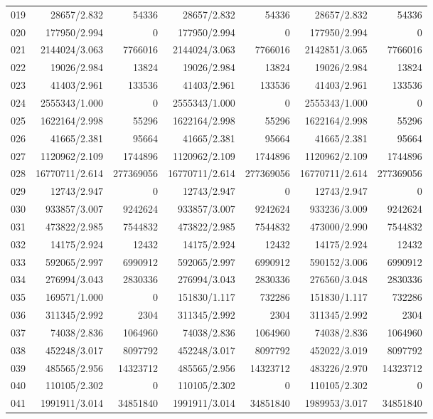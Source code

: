 \begin{longtable}{crrrrrr}
019 & 28657/2.832 & 54336 & 28657/2.832 & 54336 & 28657/2.832 & 54336 \\
020 & 177950/2.994 & 0 & 177950/2.994 & 0 & 177950/2.994 & 0 \\
021 & 2144024/3.063 & 7766016 & 2144024/3.063 & 7766016 & 2142851/3.065 & 7766016 \\
022 & 19026/2.984 & 13824 & 19026/2.984 & 13824 & 19026/2.984 & 13824 \\
023 & 41403/2.961 & 133536 & 41403/2.961 & 133536 & 41403/2.961 & 133536 \\
024 & 2555343/1.000 & 0 & 2555343/1.000 & 0 & 2555343/1.000 & 0 \\
025 & 1622164/2.998 & 55296 & 1622164/2.998 & 55296 & 1622164/2.998 & 55296 \\
026 & 41665/2.381 & 95664 & 41665/2.381 & 95664 & 41665/2.381 & 95664 \\
027 & 1120962/2.109 & 1744896 & 1120962/2.109 & 1744896 & 1120962/2.109 & 1744896 \\
028 & 16770711/2.614 & 277369056 & 16770711/2.614 & 277369056 & 16770711/2.614 & 277369056 \\
029 & 12743/2.947 & 0 & 12743/2.947 & 0 & 12743/2.947 & 0 \\
030 & 933857/3.007 & 9242624 & 933857/3.007 & 9242624 & 933236/3.009 & 9242624 \\
031 & 473822/2.985 & 7544832 & 473822/2.985 & 7544832 & 473000/2.990 & 7544832 \\
032 & 14175/2.924 & 12432 & 14175/2.924 & 12432 & 14175/2.924 & 12432 \\
033 & 592065/2.997 & 6990912 & 592065/2.997 & 6990912 & 590152/3.006 & 6990912 \\
034 & 276994/3.043 & 2830336 & 276994/3.043 & 2830336 & 276560/3.048 & 2830336 \\
035 & 169571/1.000 & 0 & 151830/1.117 & 732286 & 151830/1.117 & 732286 \\
036 & 311345/2.992 & 2304 & 311345/2.992 & 2304 & 311345/2.992 & 2304 \\
037 & 74038/2.836 & 1064960 & 74038/2.836 & 1064960 & 74038/2.836 & 1064960 \\
038 & 452248/3.017 & 8097792 & 452248/3.017 & 8097792 & 452022/3.019 & 8097792 \\
039 & 485565/2.956 & 14323712 & 485565/2.956 & 14323712 & 483226/2.970 & 14323712 \\
040 & 110105/2.302 & 0 & 110105/2.302 & 0 & 110105/2.302 & 0 \\
041 & 1991911/3.014 & 34851840 & 1991911/3.014 & 34851840 & 1989953/3.017 & 34851840 \\

\end{longtable}
